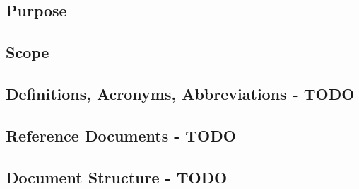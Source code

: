 \subsection{Purpose}
\label{sect:introduction:purpose}


\subsection{Scope}
\label{sect:introduction:scope}


\subsection{Definitions, Acronyms, Abbreviations - TODO}
\label{sect:introduction:description}


\subsection{Reference Documents - TODO}
\label{sect:introduction:refdocs}


\subsection{Document Structure - TODO}
\label{sect:introduction:docstructure}
